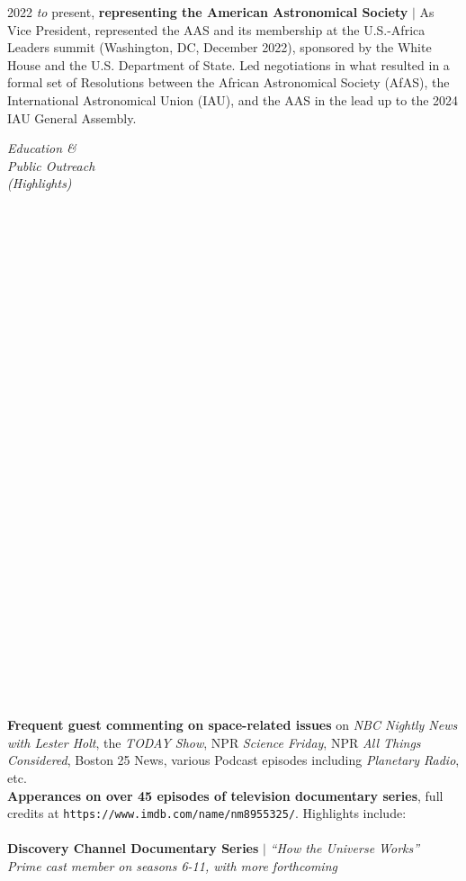 \documentclass[11pt]{article}
\begin{document}
{2022 \textit{to} present, \textbf{representing the American Astronomical Society} $|$ As Vice President, represented  the AAS and its membership at the U.S.-Africa Leaders summit (Washington, DC, December 2022), sponsored by the White House and the U.S. Department of State. Led negotiations in what resulted in a formal set of Resolutions between the African Astronomical Society (AfAS), the International Astronomical Union (IAU), and the AAS in the lead up to the 2024 IAU General Assembly.
}

\hspace{2.5mm} \parbox{1.5in}{\textit{Education \& \\ Public Outreach \\ (Highlights) \\\\\\\\\\\\\\\\\\\\\\\\\\\\\\\\\\\\\\\\\\\\\\\\\\\\\\\\\\\\}} \parbox{5.15in}{
\textbf{Frequent guest commenting on space-related issues} on \textit{NBC Nightly News with Lester Holt}, the \textit{TODAY Show}, NPR \textit{Science Friday}, NPR \textit{All Things Considered}, Boston 25 News, various Podcast episodes including \textit{Planetary Radio}, etc.\\

\textbf{Apperances on over 45 episodes of television documentary series}, full credits at \texttt{https://www.imdb.com/name/nm8955325/}. Highlights include: \\ \\
\textbf{Discovery Channel Documentary Series} $|$ \textit{``How the Universe Works''} \\
\textit{Prime cast member on seasons 6-11, with more forthcoming}\\


}
\end{document}
